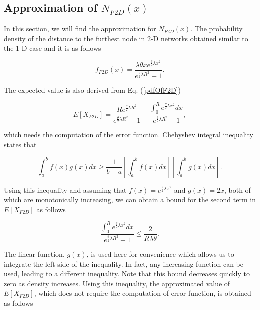 \documentclass[12pt, draftclsnofoot, onecolumn]{IEEEtran}
\begin{document}
\subsection{Approximation of $N_{F2D}(x)$}

In this section, we will find the approximation for $N_{F2D}(x)$. The probability density of the distance to 
the furthest node in $2$-D networks obtained similar to the $1$-D 
case and it is as follows

\begin{equation}
\label{pdfOfF2D}
	f_{F2D}(x) = \frac{\lambda \theta x e^{ \frac{\theta}{2}\lambda x^2}}{e^{\frac{\theta}{2}\lambda R^2}-1}.
\end{equation}

The expected value is also derived from Eq. (\ref{pdfOfF2D})

\begin{equation}
\label{ExactEF2D}
	E[X_{F2D}] = \frac{R e^{\frac{\theta}{2} \lambda R^2} }{e^{ \frac{\theta}{2}\lambda R^2}-1} -  \frac{ \int_{0}^{R} e^{\frac{\theta}{2} \lambda x^2} dx} {e^{ \frac{\theta}{2}\lambda R^2}-1},
\end{equation}

which needs the computation of the error function. Chebyshev integral inequality states that

\begin{equation}
	\int_a^b f(x)g(x) dx \geq \frac{1}{b-a} [\int_a^b f(x) dx] [\int_a^b g(x) dx].
\end{equation}

Using this inequality and assuming that 
$f(x)=e^{\frac{\theta}{2} \lambda x^2}$ and $g(x)=2x$, 
both of which are monotonically increasing, we can obtain a 
bound for the second term in $E[X_{F2D}]$ as follows
%

\begin{equation}
\label{UpperBoundF2DExpectedValue}
	\frac{ \int_{0}^{R} e^{\frac{\theta}{2} \lambda x^2} dx} {e^{ \frac{\theta}{2}\lambda R^2}-1} \leq \frac{2}{R\lambda \theta}.
\end{equation}

The linear function, $g(x)$, is used here for convenience which allows us to integrate the left side of the inequality. In fact, any increasing function can be used, leading to a different inequality. Note that this bound decreases quickly to zero as density increases. Using this inequality, the approximated value of $E[X_{F2D}]$, which 
does not require the computation of error function, is obtained as follows
\end{document}

